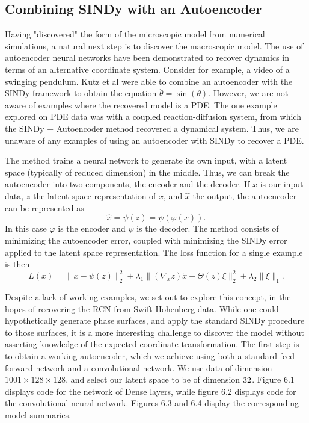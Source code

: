 \documentclass[12pt]{article}
\numberwithin{equation}{section}
\begin{document}
\subsection{Combining SINDy with an Autoencoder}
\par Having "discovered" the form of the microscopic model from numerical simulations, a natural next step is to discover the macroscopic model. The use of autoencoder neural networks have been demonstrated to recover dynamics in terms of an alternative coordinate system. Consider for example, a video of a swinging pendulum. Kutz et al were able to combine an autoencoder with the SINDy framework to obtain the equation $\ddot{\theta} = \sin(\theta)$. However, we are not aware of examples where the recovered model is a PDE. The one example explored on PDE data was with a coupled reaction-diffusion system, from which the SINDy + Autoencoder method recovered a dynamical system. Thus, we are unaware of any examples of using an autoencoder with SINDy to recover a PDE.
\par The method trains a neural network to generate its own input, with a latent space (typically of reduced dimension) in the middle. Thus, we can break the autoencoder into two components, the encoder and the decoder. If $x$ is our input data, $z$ the latent space representation of $x$, and $\hat{x}$ the output, the autoencoder can be represented as
\begin{equation}
    \hat{x} = \psi(z) = \psi(\varphi(x)).
\end{equation}
In this case $\varphi$ is the encoder and $\psi$ is the decoder. The method consists of minimizing the autoencoder error, coupled with minimizing the SINDy error applied to the latent space representation. The loss function for a single example is then
\begin{equation}
    L(x) = \|x - \psi(z)\|_2^2 + \lambda_1\|(\nabla_x z)\dot{x}-\Theta(z)\xi\|_2^2 + \lambda_2\|\xi\|_1.
\end{equation}
\par Despite a lack of working examples, we set out to explore this concept, in the hopes of recovering the RCN from Swift-Hohenberg data. While one could hypothetically generate phase surfaces, and apply the standard SINDy procedure to those surfaces, it is a more interesting challenge to discover the model without asserting knowledge of the expected coordinate transformation. The first step is to obtain a working autoencoder, which we achieve using both a standard feed forward network and a convolutional network. We use data of dimension $1001 \times 128 \times 128$, and select our latent space to be of dimension $32 \time 32$. Figure 6.1 displays code for the network of Dense layers, while figure 6.2 displays code for the convolutional neural network. Figures 6.3 and 6.4 display the corresponding model summaries.
\end{document}
